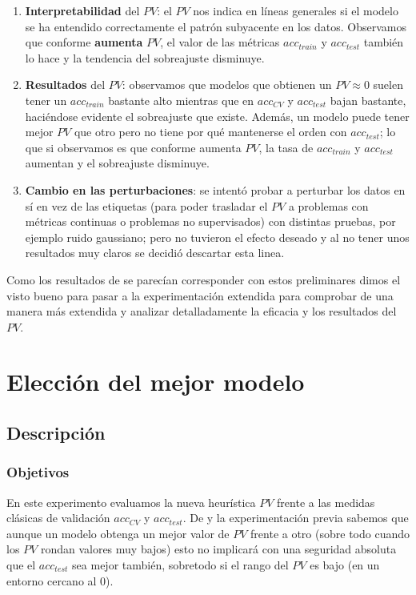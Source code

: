 \begin{enumerate}
  \item \textbf{Interpretabilidad} del $PV$: el $PV$ nos indica en líneas generales si el modelo se ha entendido correctamente el patrón subyacente en los datos. Observamos que conforme \textbf{aumenta} $PV$, el valor de las métricas $acc_{train}$ y $acc_{test}$ también lo hace y la tendencia del sobreajuste disminuye.

  \item \textbf{Resultados} del $PV$: observamos que modelos que obtienen un $PV \approx 0$ suelen tener un $acc_{train}$ bastante alto mientras que en $acc_{CV}$ y $acc_{test}$ bajan bastante, haciéndose evidente el sobreajuste que existe. Además, un modelo puede tener mejor $PV$ que otro pero no tiene por qué mantenerse el orden con $acc_{test}$; lo que si observamos es que conforme aumenta $PV$, la tasa de $acc_{train}$ y $acc_{test}$ aumentan y el sobreajuste disminuye.

  \item \textbf{Cambio en las perturbaciones}: se intentó probar a perturbar los datos en sí en vez de las etiquetas (para poder trasladar el $PV$ a problemas con métricas continuas o problemas no supervisados) con distintas pruebas, por ejemplo ruido gaussiano; pero no tuvieron el efecto deseado y al no tener unos resultados muy claros se decidió descartar esta linea.

\end{enumerate}

Como los resultados de \cite{zhang2019perturbation} se parecían corresponder con estos preliminares dimos el visto bueno para pasar a la experimentación extendida para comprobar de una manera más extendida y analizar detalladamente la eficacia y los resultados del $PV$.

\section{Elección del mejor modelo}

\subsection{Descripción}

\subsubsection{Objetivos}

En este experimento evaluamos la nueva heurística $PV$ frente a las medidas clásicas de validación $acc_{CV}$ y $acc_{test}$. De \cite{zhang2019perturbation} y la experimentación previa sabemos que aunque un modelo obtenga un mejor valor de $PV$ frente a otro (sobre todo cuando los $PV$ rondan valores muy bajos) esto no implicará con una seguridad absoluta que el $acc_{test}$ sea mejor también, sobretodo si el rango del $PV$ es bajo (en un entorno cercano al 0).

